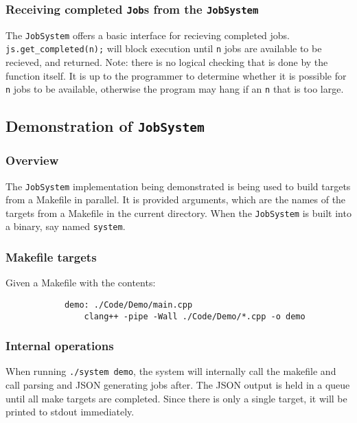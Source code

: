 \documentclass{article}
\begin{document}
		\subsubsection{Receiving completed \texttt{Job}s from the \texttt{JobSystem}}
			The \texttt{JobSystem} offers a basic interface for recieving completed jobs. \texttt{js.get\_completed(n);} will block execution until \texttt{n} jobs are available to be recieved, and returned. Note: there is no logical checking that is done by the function itself. It is up to the programmer to determine whether it is possible for \texttt{n} jobs to be available, otherwise the program may hang if an \texttt{n} that is too large.
	
	\subsection{Demonstration of \texttt{JobSystem}}
		\subsubsection{Overview}
			The \texttt{JobSystem} implementation being demonstrated is being used to build targets from a Makefile in parallel. It is provided arguments, which are the names of the targets from a Makefile in the current directory. When the \texttt{JobSystem} is built into a binary, say named \texttt{system}.
			
		\subsubsection{Makefile targets}
			Given a Makefile with the contents:
			\begin{verbatim}
			demo: ./Code/Demo/main.cpp
				clang++ -pipe -Wall ./Code/Demo/*.cpp -o demo
			\end{verbatim}
		\subsubsection{Internal operations}
			When running \texttt{./system demo}, the system will internally call the makefile and call parsing and JSON generating jobs after. The JSON output is held in a queue until all make targets are completed. Since there is only a single target, it will be printed to stdout immediately.
\end{document}
